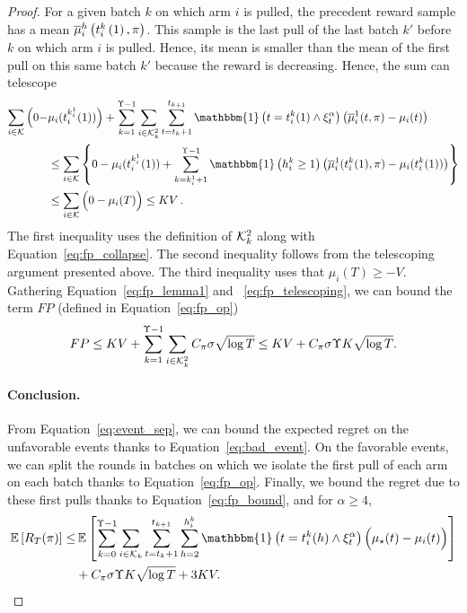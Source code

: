 \begin{proof}
For a given batch $k$ on which arm $i$ is pulled, the precedent reward sample has a mean $\overline{\mu}_i^h\left(t_i^k\left(1\right), \pi\right)$. This sample is the last pull of the last batch $k'$ before $k$ on which arm $i$ is pulled. Hence, its mean is smaller than the mean of the first pull on this same batch $k'$ because the reward is decreasing. Hence, the sum can telescope
\begin{align}
\label{eq:fp_telescoping} 
\sum_{i \in \arms} \Big(0 -& \mu_i(t_i^{k_i^1}(1))\Big) + \sum_{k=1}^{\Upsilon -1}  \sum_{i\in \arms_k^2} \sum_{t=t_k +1 }^{t_{k+1}}\mathbbm{1}\pa{ t = t_i^k(1) \land \HPevent}\pa{ \bar{\mu}^1_i(t,\pi) - \mu_{i}(t)} \nonumber\\
& \leq \sum_{i \in \arms}\left\{ 0- \mu_i(t_i^{k_i^1}(1)) + \sum_{k=k_i^1 + 1}^{\Upsilon-1 } \mathbbm{1}\pa{h^k_{i} \geq 1  }\pa{\bar{\mu}^1_i(t_i^k(1), \pi) - \mu_{i}(t_i^k(1))} \right\} \nonumber\\
& \leq \sum_{i \in \arms} \Big(0-\mu_i(T)\Big) \leq KV\,.  
\end{align}
The first inequality uses the definition of $\mathcal{K}_k^2$ along with Equation~\ref{eq:fp_collapse}. The second inequality follows from the telescoping argument presented above. The third inequality uses that $\mu_i(T) \geq -V$. Gathering Equation~\ref{eq:fp_lemma1} and  ~\ref{eq:fp_telescoping}, we can bound the term $FP$ (defined in Equation~\ref{eq:fp_op}) 
\begin{equation}
\label{eq:fp_bound}
FP \leq  KV + \sum_{k=1}^{\Upsilon - 1} \sum_{i\in \mathcal{K}_k^2} C_\pi \sigma \sqrt{\log{T}} \leq KV + C_\pi \sigma \Upsilon K\sqrt{\log{T}} .    
\end{equation}



\paragraph{Conclusion.} From Equation~\ref{eq:event_sep}, we can bound the expected regret on the unfavorable events thanks to Equation~\ref{eq:bad_event}. On the favorable events, we can split the rounds in batches on which we isolate the first pull of each arm on each batch thanks to Equation~\ref{eq:fp_op}. Finally, we bound the regret due to these first pulls thanks to Equation~\ref{eq:fp_bound}, and for $\alpha \geq 4$,
\begin{align*}
\EE{R_T(\pi)} \leq &  \, \EE{\sum_{k=0}^{\Upsilon-1} \sum_{i\in\arms_k}\sum_{t=t_k +1 }^{t_{k+1}}\sum_{h=2}^{h^k_{i}}\mathbbm{1}\pa{ t = t_i^k(h) \land \HPevent} \Big( \mu_{\star}(t) - \mu_{i}(t)\Big)} \\
&+  C_\pi \sigma \Upsilon K \sqrt{\log{T}} + 3KV.
\end{align*}


\end{proof}
